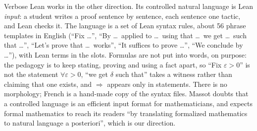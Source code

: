 \documentclass{easychair}
\begin{document}
Verbose Lean \cite{massot-2024} works in the other direction. Its controlled natural language
is Lean \emph{input}: a student writes a proof sentence by sentence, each sentence one tactic,
and Lean checks it. The language is a set of Lean syntax rules, about 56 phrase templates in
English (``Fix \ldots'', ``By \ldots\ applied to \ldots\ using that \ldots\ we get \ldots\ such
that \ldots'', ``Let's prove that \ldots\ works'', ``It suffices to prove \ldots'', ``We conclude
by \ldots''), with Lean terms in the slots. Formulas are not put into words, on purpose: the
pedagogy is to keep stating, proving and using a fact apart, so ``Fix $\varepsilon > 0$'' is not
the statement $\forall \varepsilon > 0$, ``we get $\delta$ such that'' takes a witness rather than
claiming that one exists, and $\Rightarrow$ appears only in statements. There is no
morphology; French is a hand-made copy of the syntax files. Massot doubts that a controlled
language is an efficient input format for mathematicians, and expects formal mathematics to
reach its readers ``by translating formalized mathematics to natural language a posteriori'',
which is our direction.
\end{document}
